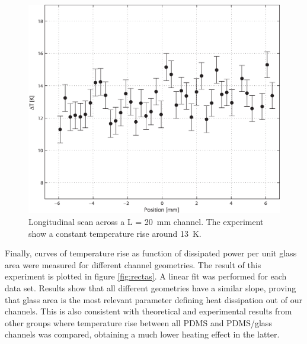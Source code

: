 \documentclass[twocolumn]{svjour3}       %
\begin{document}

\begin{figure}[h!]
\centering
\includegraphics[width=\columnwidth]{figs/long.eps}
\caption{Longitudinal scan across a L = 20~mm channel. The experiment show a constant temperature rise around 13~K.\label{fig:long}}
\end{figure}

Finally, curves of temperature rise as function of dissipated power per unit glass area were measured for different channel geometries. The result of this experiment is plotted in figure \ref{fig:rectas}. A linear fit was performed for each data set. Results show that all different geometries have a similar slope, proving that glass area is the most relevant parameter defining heat dissipation out of our channels. This is also consistent with theoretical and experimental results from other groups \cite{erickson2003} where temperature rise between all PDMS and PDMS/glass channels was compared, obtaining a much lower heating effect in the latter. 
\end{document}
